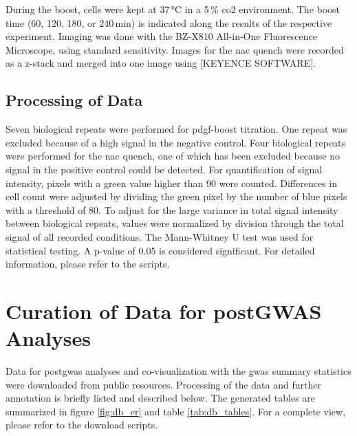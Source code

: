     During the boost, cells were kept at 37\,°C in a 5\,\% \ac{co2} environment. The boost time (60, 120, 180, or 240\,min) is indicated along the results of the respective experiment. Imaging was done with the BZ-X810 All-in-One Fluorescence Microscope, using standard sensitivity. Images for the \acf{nac} quench were recorded as a z-stack and merged into one image using [KEYENCE SOFTWARE].

    \subsection{Processing of Data}
    \label{subsec:cellrox_data_processing}
    Seven biological repeats were performed for \ac{pdgf}-boost titration. One repeat was excluded because of a high signal in the negative control. Four biological repeats were performed for the \ac{nac} quench, one of which has been excluded because no signal in the positive control could be detected.
    For quantification of signal intensity, pixels with a green value higher than 90 were counted. Differences in cell count were adjusted by dividing the green pixel by the number of blue pixels with a threshold of 80. To adjust for the large variance in total signal intensity between biological repeats, values were normalized by division through the total signal of all recorded conditions.
    The Mann-Whitney U test was used for statistical testing. A p-value of 0.05 is considered significant. For detailed information, please refer to the scripts.


\section{Curation of Data for postGWAS Analyses}
\label{sec:database}
Data for post\ac{gwas} analyses and co-visualization with the \ac{gwas} summary statistics were downloaded from public resources. Processing of the data and further annotation is briefly listed and described below. The generated tables are summarized in figure \ref{fig:db_er} and table \ref{tab:db_tables}. For a complete view, please refer to the download scripts.

